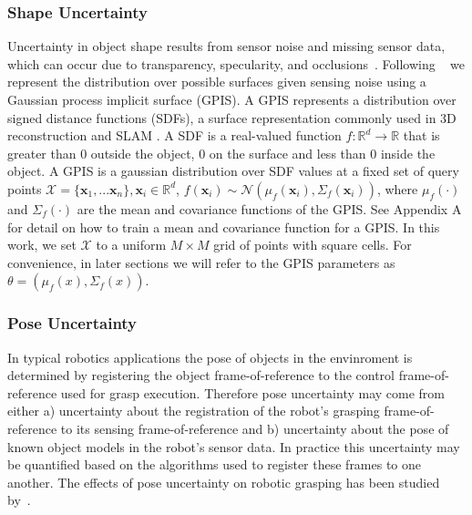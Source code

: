 \documentclass[journal,transmag]{IEEEtran}%
\newcommand{\bx}{\mathbf{x}}
\newcommand{\mX}{\mathcal{X}}
\newcommand{\mN}{\mathcal{N}}
\begin{document}
\subsubsection{Shape Uncertainty}

Uncertainty in object shape results from sensor noise and missing sensor data, which can occur due to transparency, specularity, and occlusions~\cite{mahler2015gp}.
Following ~\cite{laskey2015bandits, mahler2015gp} we represent the distribution over possible surfaces given sensing noise using a Gaussian process implicit surface (GPIS).
A GPIS represents a distribution over signed distance functions (SDFs), a surface representation commonly used in 3D reconstruction and SLAM \cite{}.
A SDF is a real-valued function $f: \mathbb{R}^d \rightarrow \mathbb{R}$ that is greater than 0 outside the object, 0 on the surface and less than 0 inside the object.
A GPIS is a gaussian distribution over SDF values at a fixed set of query points $\mX = \{\bx_1, ... \bx_n\}, \bx_i \in \mathbb{R}^d$, $f(\bx_i) \sim \mN(\mu_{f}(\bx_i),\Sigma_{f}(\bx_i))$, where $\mu_{f}(\cdot)$ and $\Sigma_{f}(\cdot)$ are the mean and covariance functions of the GPIS.
See Appendix A for detail on how to train a mean and covariance function for a GPIS.
In this work, we set $\mX$ to a uniform $M \times M$ grid of points with square cells.
For convenience, in later sections we will refer to the GPIS parameters as $\theta = \left( \mu_{f}(x), \Sigma_{f}(x) \right)$. 


\subsubsection{Pose Uncertainty}
In typical robotics applications the pose of objects in the envinroment is determined by registering the object frame-of-reference to the control frame-of-reference used for grasp execution.
Therefore pose uncertainty may come from either a) uncertainty about the registration of the robot's grasping frame-of-reference to its sensing frame-of-reference and b) uncertainty about the pose of known object models in the robot's sensor data.
In practice this uncertainty may be quantified based on the algorithms used to register these frames to one another.
The effects of pose uncertainty on robotic grasping has been studied by~\cite{weisz2012pose, kim2012physically}. %
\end{document}
